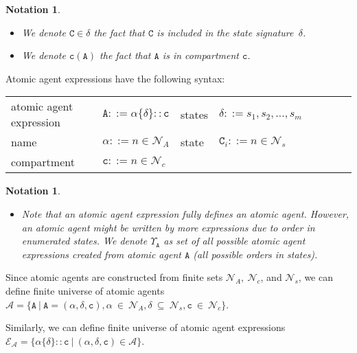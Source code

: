 \documentclass{entcs}
\renewcommand{\~}[0]{\texttildelow}
\newtheorem{notation}[thm]{Notation}
\begin{document}
\begin{notation}
{~}
\begin{itemize}
\item We denote $\mathtt{C}\in\delta$ the fact that $\mathtt{C}$ is included in the state signature~$\delta$.
\item We denote $\mathtt{c}(\mathtt{A})$ the fact that $\mathtt{A}$ is in compartment $\mathtt{c}$.
\end{itemize}
\end{notation}

Atomic agent expressions have the following syntax:

\begin{center}
{\small
\hspace*{-1cm}\begin{tabular}{ ll ll ll ll }
 atomic agent expression & $\mathtt{A} ::= \alpha\{\delta\}::\mathtt{c}$ & states & $ \delta ::= s_1, s_2, ..., s_m$ \\
 name & $\alpha ::= n \in \mathcal{N}_{A}$  & state & $\mathtt{C}_i ::= n \in \mathcal{N}_{s}$\\
 compartment & $\mathtt{c} ::= n \in \mathcal{N}_{c}$\\
\end{tabular}
}
\end{center}

\begin{notation}
{~}
\begin{itemize}
\item Note that an atomic agent expression fully defines an atomic agent. However, an atomic agent might be written by more expressions due to order in enumerated states. We denote $\Upsilon_\mathtt{A}$ as set of all possible atomic agent expressions created from atomic agent $\mathtt{A}$ (all possible orders in states).
\end{itemize}
\end{notation}

\begin{theorem}
Since atomic agents are constructed from finite sets $\mathcal{N}_{A},~\mathcal{N}_{c}$, and $\mathcal{N}_{s}$, we can define finite universe of atomic agents $\mathcal{A} = \{ \mathtt{A}~|~\mathtt{A} = (\alpha, \delta, \mathtt{c}), \alpha~\in~\mathcal{N}_{A}, \delta~\subseteq~\mathcal{N}_{s},  \mathtt{c}~\in~\mathcal{N}_{c} \}$. 

\noindent Similarly, we can define finite universe of atomic agent expressions\\ $\mathcal{E}_\mathcal{A} = \{ \alpha\{\delta\}::\mathtt{c} ~|~ (\alpha, \delta, \mathtt{c}) \in \mathcal{A} \} $.
\end{theorem}
\end{document}
